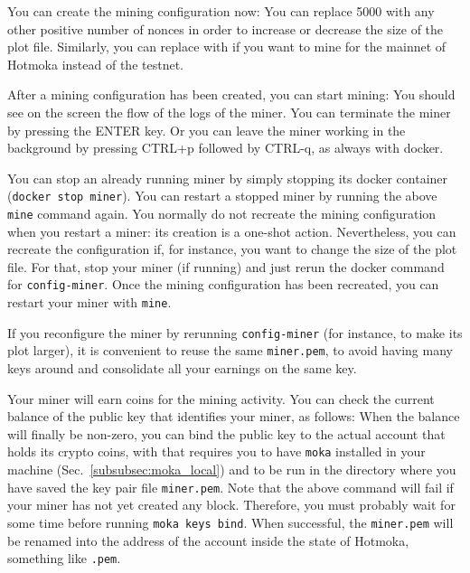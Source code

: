 You can create the mining configuration now:
%
%
You can replace 5000 with any other positive number of nonces in order to increase or decrease the size of the plot file.
Similarly, you can replace \texttt{\serverMokamintMining{}} with
\texttt{\serverMokamintMainMining{}} if you want to mine for the mainnet of Hotmoka instead of the testnet.

After a mining configuration has been created, you can start mining:
%
%
You should see on the screen the flow of the logs of the miner.
You can terminate the miner by pressing the ENTER key.
Or you can leave the miner working in the background
by pressing CTRL+p followed by CTRL-q, as always with docker.

You can stop an already running miner by simply stopping its docker container (\texttt{docker stop miner}).
You can restart a stopped miner by running the above \texttt{mine} command again.
You normally do not recreate the mining configuration when you restart a miner: its creation is a one-shot action.
Nevertheless, you can recreate the configuration if, for instance, you want to change the size of the plot file.
For that, stop your miner (if running) and just rerun the docker command for \texttt{config-miner}.
Once the mining configuration has been recreated, you can restart your miner with \texttt{mine}.

\begin{commentbox}
If you reconfigure the miner by rerunning \texttt{config-miner} (for instance, to make its plot larger), it is
convenient to reuse the same \texttt{miner.pem}, to avoid having many keys around and
consolidate all your earnings on the same key.
\end{commentbox}

Your miner will earn coins for the mining activity. You can check the current balance of the public key
that identifies your miner, as follows:
%
%
When the balance will finally be non-zero, you can bind the public key to the actual account that holds its crypto coins, with
%
%
that requires you to have \texttt{moka} installed in your machine (Sec.~\ref{subsubsec:moka_local})
and to be run in the directory where you have saved the key pair file \texttt{miner.pem}.
Note that the above command will fail if your miner has not yet created any block. Therefore,
you must probably wait for some time before running \texttt{moka keys bind}. When successful,
the \texttt{miner.pem} will be renamed into the address of the account inside the state of
Hotmoka, something like \texttt{\gameteShort{}.pem}.

